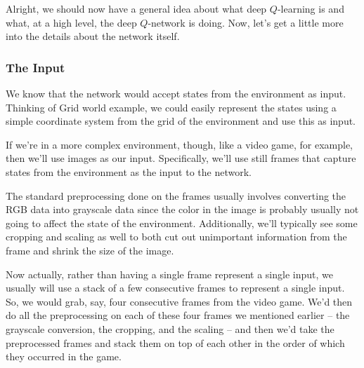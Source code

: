 Alright, we should now have a general idea about what deep $Q$-learning is and what, at 
a high level, the deep $Q$-network is doing. Now, let's get a little more into the details 
about the network itself.


\subsubsection{The Input}

We know that the network would accept states from the environment as input. Thinking of 
Grid world example, we could easily represent the states using a simple coordinate system 
from the grid of the environment and use this as input.

If we're in a more complex environment, though, like a video game, for example, then 
we'll use images as our input. Specifically, we'll use still frames that capture states 
from the environment as the input to the network.

The standard preprocessing done on the frames usually involves converting the RGB data 
into grayscale data since the color in the image is probably usually not going to affect 
the state of the environment. Additionally, we'll typically see some cropping and scaling 
as well to both cut out unimportant information from the frame and shrink the size of 
the image.

Now actually, rather than having a single frame represent a single input, we usually 
will use a stack of a few consecutive frames to represent a single input. So, we would 
grab, say, four consecutive frames from the video game. We'd then do all the preprocessing 
on each of these four frames we mentioned earlier – the grayscale conversion, the 
cropping, and the scaling – and then we'd take the preprocessed frames and stack them on 
top of each other in the order of which they occurred in the game.

